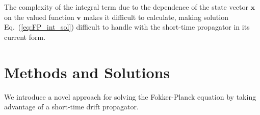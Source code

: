 \documentclass[aps,pre,reprint,superscriptaddress,showpacs,amsmath
,floatfix
]{revtex4-2}
\renewcommand{\vec}[1]{\boldsymbol{#1}}
\newcommand{\eq}[1]{Eq.~(\ref{#1})}
\begin{document}
The complexity of the integral term due to the dependence of the state vector $\vec{x}$ on the valued function $\vec{v}$ makes it difficult to calculate, making solution \eq{eq:FP_int_sol} difficult to handle with the short-time propagator in its current form.

\section{Methods and Solutions}
We introduce a novel approach for solving the Fokker-Planck equation by taking advantage of a short-time drift propagator.

\end{document}
